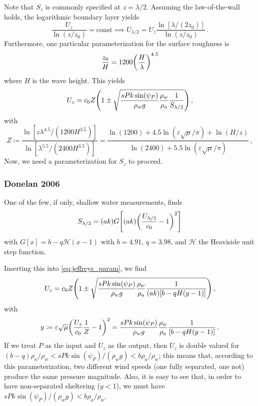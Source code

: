 \documentclass{jfm}
\let\Oldsubsubsection\subsubsection
\renewcommand{\subsubsection}{\FloatBarrier\Oldsubsubsection}
\renewcommand*{\epsilon}{\varepsilon}
\begin{document}
Note that $S_z$ is commonly specified at $z=\lambda/2$.
Assuming the law-of-the-wall holds, the logarithmic boundary layer
yields
\begin{equation}
  \frac{U_z}{\ln(z/z_0)} = \text{const}
  \implies U_{\lambda/2}  = U_{z} \frac{\ln[\lambda/(2 z_0)]}{\ln(z/z_0)}
  \,.
\end{equation}
Furthermore, one particular parameterization for the surface roughness
is \citep{taylor2001dependence}
\begin{equation}
  \frac{z_0}{H} = 1200 \pqty{\frac{H}{\lambda}}^{4.5}
\end{equation}
where $H$ is the wave height.
This yields
\begin{equation}
  U_z = c_0 Z \pqty{1 \pm \sqrt{\frac{s P k \sin(\psi_P)}{\rho_w g}
    \frac{\rho_w}{\rho_a} \frac{1}{S_{\lambda/2}}}} \,,
  \label{eq:jeffreys_param}
\end{equation}
with
\begin{equation}
  Z \coloneqq
  \frac{\ln[z\lambda^{4.5}/(1200 H^{3.5})]}{\ln[\lambda^{5.5}/(2400 H^{3.5})]}
  =
  \frac{\ln(1200) + 4.5 \ln(\epsilon \sqrt{\mu}/\pi) + \ln(H/z)}
    {\ln(2400)+5.5\ln(\epsilon \sqrt{\mu}/\pi)} \,,
\end{equation}
Now, we need a parameterization for $S_z$ to proceed.

\subsubsection{Donelan 2006}
One of the few, if only, shallow water measurements,
\citet{donelan2006wave} finds
\begin{equation}
  S_{\lambda/2} = (ak) G \bqty{(ak)
  \pqty{\frac{U_{\lambda/2}}{c_0} - 1}^2}
\end{equation}
with $G[x] = b - q \mathcal{H}(x - 1)$ with $b = 4.91$, $q = 3.98$, and
$\mathcal{H}$ the Heaviside unit step function.

Inserting this into \cref{eq:jeffreys_param}, we find
\begin{equation}
  U_z = c_0 Z \pqty{1 \pm \sqrt{\frac{s P k \sin(\psi_P)}{\rho_w g}
    \frac{\rho_w}{\rho_a} \frac{1}{(ak) \bqty{b-q H\pqty{y-1}}}}} \,,
\end{equation}
with
\begin{equation}
  y \coloneqq
  \epsilon \sqrt{\mu} \pqty{\frac{U_{z}}{c_0} \frac{1}{Z} - 1}^2
  = \frac{s P k \sin(\psi_P)}{\rho_w g}
    \frac{\rho_w}{\rho_a} \frac{1}{\bqty{b-q H\pqty{y-1}}}
    \,.
\end{equation}
If we treat $P$ as the input and $U_z$ as the output, then $U_z$ is
double valued for $(b-q) \rho_a/\rho_w < sPk\sin(\psi_P)/(\rho_w g) < b
\rho_a/\rho_w$; this means that, according to this parameterization, two
different wind speeds (one fully separated, one not) produce the same
pressure magnitude.
Also, it is easy to see that, in order to have non-separated sheltering
(\ie $y<1$), we must have $sPk\sin(\psi_P)/(\rho_w g) < b \rho_a/\rho_w$.
\end{document}
